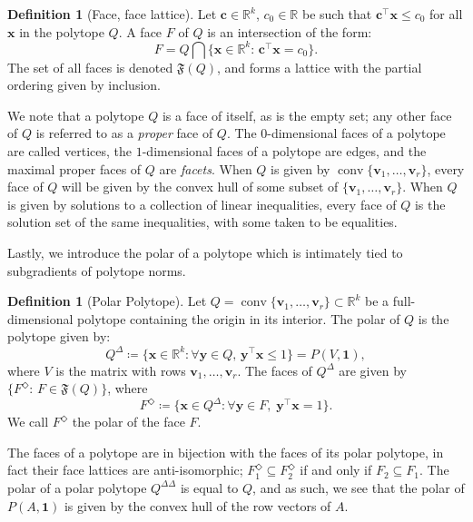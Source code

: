 \documentclass[10pt]{article}
\theoremstyle{definition}
\newtheorem{definition}[theorem]{Definition}
\theoremstyle{remark}
\newcommand{\R}{\mathbb{R}}
\newcommand{\T}{\intercal}
\DeclareMathOperator{\conv}{conv}
\renewcommand{\vec}[1]{\mathbf{#1}}
\begin{document}
	\begin{definition}[Face, face lattice]
		Let $\vec c \in \R^k$, $c_0 \in \R$ be such that $\vec c ^{\T} \vec x \leq c_0$ for all $\vec x$ in the polytope $Q$. A face $F$ of $Q$ is an intersection of the form:
		\[
		F= Q \bigcap \{ \vec x \in \R^k : \, \vec c^{\T} \vec x = c_0 \}.
		\]
		The set of all faces is denoted $\mathfrak{F}(Q)$, and forms a lattice with the partial ordering given by inclusion.
	\end{definition}
	
	We note that a polytope $Q$ is a face of itself, as is the empty set; any other face of $Q$ is referred to as a \emph{proper} face of $Q$. The $0$-dimensional faces of a polytope are called vertices, the $1$-dimensional faces of a polytope are edges, and the maximal proper faces of $Q$ are \emph{facets}. When $Q$ is given by $\conv \{ \vec v_1, \dots, \vec v_r \}$, every face of $Q$ will be given by the convex hull of some subset of $\{ \vec v_1, \dots, \vec v_r \}$. When $Q$ is given by solutions to a collection of linear inequalities, every face of $Q$ is the solution set of the same inequalities, with some taken to be equalities.
	
	Lastly, we introduce the polar of a polytope which is intimately tied to subgradients of polytope norms.
	
	\begin{definition}[Polar Polytope]
		Let $Q = \conv \{ \vec v_1, \dots, \vec v_r \} \subset \R^k$ be a full-dimensional polytope containing the origin in its interior. The polar of $Q$ is the polytope given by:
		\[
		Q^{\Delta} \coloneqq \{ \vec x \in \R^k : \forall \vec y \in Q , \, \vec y^{\T} \vec x \leq 1 \} = P(V,\mathbf 1),
		\]
		where $V$ is the matrix with rows $\vec v_1, \dots, \vec v_r$. The faces of $Q^{\Delta}$ are given by $\{ F^{\Diamond}: \, F \in \mathfrak{F}(Q) \}$, where
		\[
		F^{\Diamond} \coloneqq \{ \vec x \in Q^{\Delta} : \forall \vec y \in F, \; \vec y^{\T} \vec x = 1 \}.
		\]
		We call $F^{\Diamond}$ the polar of the face $F$.
	\end{definition}
	
	The faces of a polytope are in bijection with the faces of its polar polytope, in fact their face lattices are anti-isomorphic; $F_1^{\Diamond} \subseteq F_2^{\Diamond}$ if and only if $F_2 \subseteq F_1$. The polar of a polar polytope $Q^{\Delta \Delta}$ is equal to $Q$, and as such, we see that the polar of $P(A, \vec 1)$ is given by the convex hull of the row vectors of $A$. 
	
\end{document}
